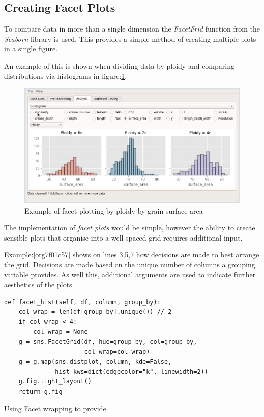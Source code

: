 \documentclass[11pt]{report}
\begin{document}
\clearpage
\subsection{Creating Facet Plots}
\label{sec:org30f7d5a}

To compare data in more than a single dimension the \emph{FacetFrid} function from the \emph{Seaborn} library is used. This provides a simple method of creating multiple plots in a single figure.

An example of this is shown when dividing data by ploidy and comparing distributions via histograms in figure:\ref{fig:orgb6a9721}.

\begin{figure}[htbp]
\centering
\includegraphics[width=12cm]{./images/facet_example.png}
\caption{\label{fig:orgb6a9721}
Example of facet plotting by ploidy by grain surface area}
\end{figure}

The implementation of \emph{facet plots} would be simple, however the ability to create sensible plots that organise into a well spaced grid requires additional input.

Example:\ref{org7f01c57} shows on lines 3,5,7 how decisions are made to best arrange the grid. Decisions are made based on the unique number of columns a grouping variable provides. As well this,  additional arguments are  used to indicate further aesthetics of the plots.

\begin{listing}[htbp]
\begin{verbatim}
def facet_hist(self, df, column, group_by):
    col_wrap = len(df[group_by].unique()) // 2
    if col_wrap < 4:
        col_wrap = None
    g = sns.FacetGrid(df, hue=group_by, col=group_by,
                      col_wrap=col_wrap)
    g = g.map(sns.distplot, column, kde=False,
              hist_kws=dict(edgecolor="k", linewidth=2))
    g.fig.tight_layout()
    return g.fig
\end{verbatim}
\caption{\label{org7f01c57}
Using Facet wrapping to provide}
\end{listing}
\end{document}

